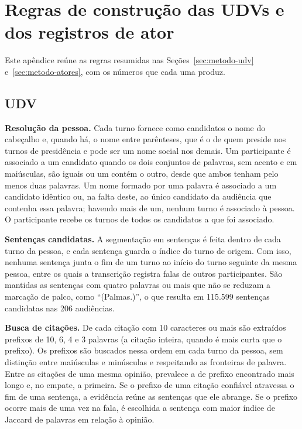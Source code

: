 \section{Regras de construção das UDVs e dos registros de ator}
\label{ap:regras}

Este apêndice reúne as regras resumidas nas Seções~\ref{sec:metodo-udv} e~\ref{sec:metodo-atores},
com os números que cada uma produz.

\subsection{UDV}
\label{ap:regras-udv}

\textbf{Resolução da pessoa.} Cada turno fornece como candidatos o nome do cabeçalho e, quando há, o
nome entre parênteses, que é o de quem preside nos turnos de presidência e pode ser um nome social
nos demais. Um participante é associado a um candidato quando os dois conjuntos de palavras, sem
acento e em maiúsculas, são iguais ou um contém o outro, desde que ambos tenham pelo menos duas
palavras. Um nome formado por uma palavra é associado a um candidato idêntico ou, na falta deste, ao
único candidato da audiência que contenha essa palavra; havendo mais de um, nenhum turno é associado
à pessoa. O participante recebe os turnos de todos os candidatos a que foi associado.

\textbf{Sentenças candidatas.} A segmentação em sentenças é feita dentro de cada turno da pessoa, e
cada sentença guarda o índice do turno de origem. Com isso, nenhuma sentença junta o fim de um turno
ao início do turno seguinte da mesma pessoa, entre os quais a transcrição registra falas de outros
participantes. São mantidas as sentenças com quatro palavras ou mais que não se reduzam a marcação de
palco, como ``(Palmas.)'', o que resulta em 115.599 sentenças candidatas nas 206 audiências.

\textbf{Busca de citações.} De cada citação com 10 caracteres ou mais são extraídos prefixos de 10, 6,
4 e 3 palavras (a citação inteira, quando é mais curta que o prefixo). Os prefixos são buscados nessa
ordem em cada turno da pessoa, sem distinção entre maiúsculas e minúsculas e respeitando as fronteiras
de palavra. Entre as citações de uma mesma opinião, prevalece a de prefixo encontrado mais longo e,
no empate, a primeira. Se o prefixo de uma citação confiável atravessa o fim de uma sentença, a
evidência reúne as sentenças que ele abrange. Se o prefixo ocorre mais de uma vez na fala, é
escolhida a sentença com maior índice de Jaccard de palavras em relação à opinião.

